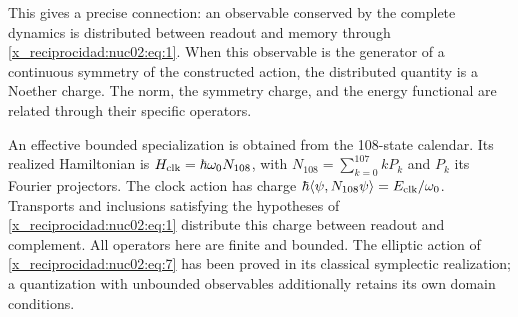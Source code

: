 This gives a precise connection: an observable conserved by the complete dynamics is distributed between readout and memory through \eqref{x_reciprocidad:nuc02:eq:1}. When this observable is the generator of a continuous symmetry of the constructed action, the distributed quantity is a Noether charge. The norm, the symmetry charge, and the energy functional are related through their specific operators.

An effective bounded specialization is obtained from the 108-state calendar. Its realized Hamiltonian is \(H_{\rm clk}=\hbar\omega_0N_{108}\), with \(N_{108}=\sum_{k=0}^{107}kP_k\) and \(P_k\) its Fourier projectors. The clock action has charge \(\hbar\langle\psi,N_{108}\psi\rangle=E_{\rm clk}/\omega_0\). Transports and inclusions satisfying the hypotheses of \eqref{x_reciprocidad:nuc02:eq:1} distribute this charge between readout and complement. All operators here are finite and bounded. The elliptic action of \eqref{x_reciprocidad:nuc02:eq:7} has been proved in its classical symplectic realization; a quantization with unbounded observables additionally retains its own domain conditions.
